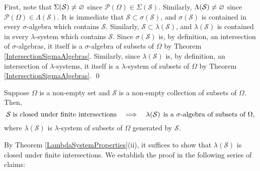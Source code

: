 \proof
First, note that $\Sigma\!\left(\mathcal{S}\right) \neq \varnothing$
since $\mathcal{P}(\Omega) \in \Sigma\!\left(\mathcal{S}\right)$.
Similarly, $\Lambda\!\left(\mathcal{S}\right) \neq \varnothing$
since $\mathcal{P}(\Omega) \in \Lambda\!\left(\mathcal{S}\right)$.
It is immediate that $\mathcal{S} \subset \sigma\!\left(\mathcal{S}\right)$, and
$\sigma\!\left(\mathcal{S}\right)$ is contained in every $\sigma$-algebra which contains $\mathcal{S}$.
Similarly, $\mathcal{S} \subset \lambda\!\left(\mathcal{S}\right)$, and
$\lambda\!\left(\mathcal{S}\right)$ is contained in every $\lambda$-system which contains $\mathcal{S}$.
Since $\sigma\!\left(\mathcal{S}\right)$ is, by definition, an intersection of $\sigma$-algebras,
it itself is a $\sigma$-algebra of subsets of $\Omega$ by Theorem \ref{IntersectionSigmaAlgebras}.
Similarly, since $\lambda\!\left(\mathcal{S}\right)$ is, by definition, an intersection of $\lambda$-systems,
it itself is a $\lambda$-system of subsets of $\Omega$ by Theorem \ref{IntersectionSigmaAlgebras}.
\qed

\begin{theorem}\label{PiIsSigmaAlgebra}
\quad
Suppose $\Omega$ is a non-empty set and $\mathcal{S}$ is a non-empty collection of subsets of $\Omega$.
Then,
\begin{equation*}
	\mathcal{S} \;\textnormal{is closed under finite intersections}
	\quad\Longrightarrow\quad
	\lambda\!\left(\mathcal{S}\right) \;\textnormal{is a $\sigma$-algebra of subsets of $\Omega$},
\end{equation*}
where $\lambda\!\left(\mathcal{S}\right)$ is $\lambda$-system of subsets of $\Omega$ generated by $\mathcal{S}$.
\end{theorem}
\proof
By Theorem \ref{LambdaSystemProperties}(ii), it suffices to show that $\lambda\!\left(\mathcal{S}\right)$
is closed under finite intersections. We establish the proof in the following series of claims:


